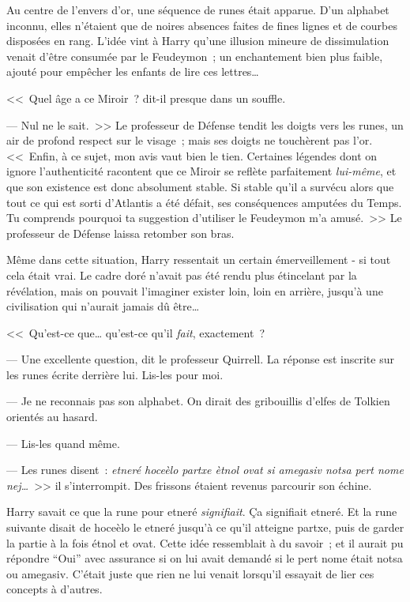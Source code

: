 Au centre de l'envers d'or, une séquence de runes était apparue. D'un alphabet inconnu, elles n'étaient que de noires absences faites de fines lignes et de courbes disposées en rang. L'idée vint à Harry qu'une illusion mineure de dissimulation venait d'être consumée par le Feudeymon~; un enchantement bien plus faible, ajouté pour empêcher les enfants de lire ces lettres…

<<~Quel âge a ce Miroir~? dit-il presque dans un souffle.

--- Nul ne le sait.~>> Le professeur de Défense tendit les doigts vers les runes, un air de profond respect sur le visage~; mais ses doigts ne touchèrent pas l'or. <<~Enfin, à ce sujet, mon avis vaut bien le tien. Certaines légendes dont on ignore l'authenticité racontent que ce Miroir se reflète parfaitement \emph{lui-même}, et que son existence est donc absolument stable. Si stable qu'il a survécu alors que tout ce qui est sorti d'Atlantis a été défait, ses conséquences amputées du Temps. Tu comprends pourquoi ta suggestion d'utiliser le Feudeymon m'a amusé.~>> Le professeur de Défense laissa retomber son bras.

Même dans cette situation, Harry ressentait un certain émerveillement - si tout cela était vrai. Le cadre doré n'avait pas été rendu plus étincelant par la révélation, mais on pouvait l'imaginer exister loin, loin en arrière, jusqu'à une civilisation qui n'aurait jamais dû être…

<<~Qu'est-ce que… qu'est-ce qu'il \emph{fait}, exactement~?

--- Une excellente question, dit le professeur Quirrell. La réponse est inscrite sur les runes écrite derrière lui. Lis-les pour moi.

--- Je ne reconnais pas son alphabet. On dirait des gribouillis d'elfes de Tolkien orientés au hasard.

--- Lis-les quand même. 

--- Les runes disent~: \emph{etneré hoceèlo partxe ètnol ovat si amegasiv notsa pert nome nej…}~>> il s'interrompit. Des frissons étaient revenus parcourir son échine.

Harry savait ce que la rune pour etneré \emph{signifiait}. Ça signifiait etneré. Et la rune suivante disait de hoceèlo le etneré jusqu'à ce qu'il atteigne partxe, puis de garder la partie à la fois étnol et ovat. Cette idée ressemblait à du savoir~; et il aurait pu répondre “Oui” avec assurance si on lui avait demandé si le pert nome était notsa ou amegasiv. C'était juste que rien ne lui venait lorsqu'il essayait de lier ces concepts à d'autres.

